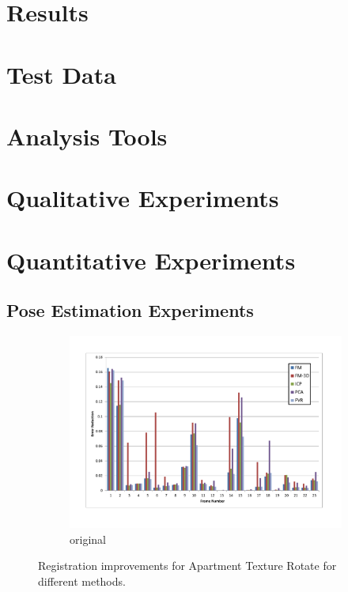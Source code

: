 \section{Results}

\section{Test Data}

\section{Analysis Tools}

\section{Qualitative Experiments}

\section{Quantitative Experiments}

\subsection{Pose Estimation Experiments}

\begin{figure}[t!] 
        \centering
        \begin{subfigure}[b]{6.0in}
                \includegraphics[width=6.0in]{images/results/Apartment_Texture_Rotate}
                \caption{original}
                \label{fig:PEE1}
        \end{subfigure}
       \caption{Registration improvements for Apartment Texture Rotate for different methods.}\label{fig:PEE1Fig}
\end{figure}

